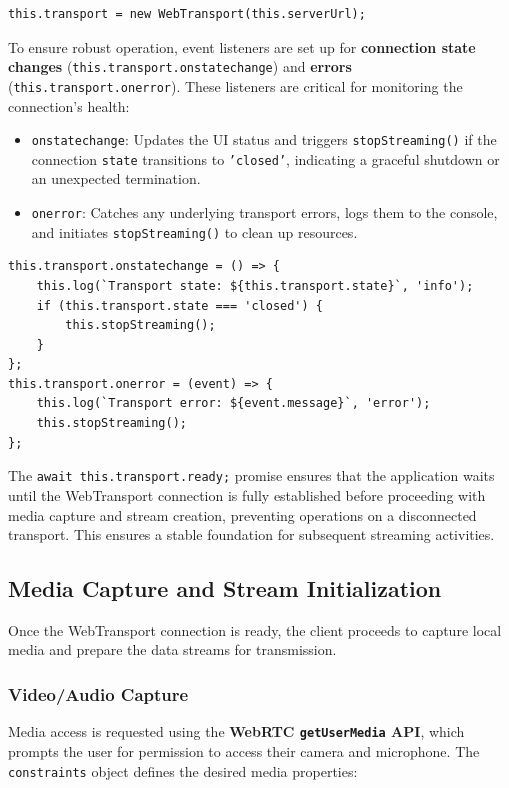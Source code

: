 \begin{lstlisting}
this.transport = new WebTransport(this.serverUrl);
\end{lstlisting}

To ensure robust operation, event listeners are set up for \textbf{connection state changes} (\texttt{this.transport.onstatechange}) and \textbf{errors} (\texttt{this.transport.onerror}). These listeners are critical for monitoring the connection's health:

\begin{itemize}
    \item \texttt{onstatechange}: Updates the UI status and triggers \texttt{stopStreaming()} if the connection \texttt{state} transitions to \texttt{'closed'}, indicating a graceful shutdown or an unexpected termination.
    \item \texttt{onerror}: Catches any underlying transport errors, logs them to the console, and initiates \texttt{stopStreaming()} to clean up resources.
\end{itemize}

\begin{lstlisting}
this.transport.onstatechange = () => {
    this.log(`Transport state: ${this.transport.state}`, 'info');
    if (this.transport.state === 'closed') {
        this.stopStreaming();
    }
};
this.transport.onerror = (event) => {
    this.log(`Transport error: ${event.message}`, 'error');
    this.stopStreaming();
};
\end{lstlisting}

The \texttt{await this.transport.ready;} promise ensures that the application waits until the WebTransport connection is fully established before proceeding with media capture and stream creation, preventing operations on a disconnected transport. This ensures a stable foundation for subsequent streaming activities.

\subsection{Media Capture and Stream Initialization}
Once the WebTransport connection is ready, the client proceeds to capture local media and prepare the data streams for transmission.

\subsubsection{Video/Audio Capture}
Media access is requested using the \textbf{WebRTC \texttt{getUserMedia} API}, which prompts the user for permission to access their camera and microphone. The \texttt{constraints} object defines the desired media properties:

